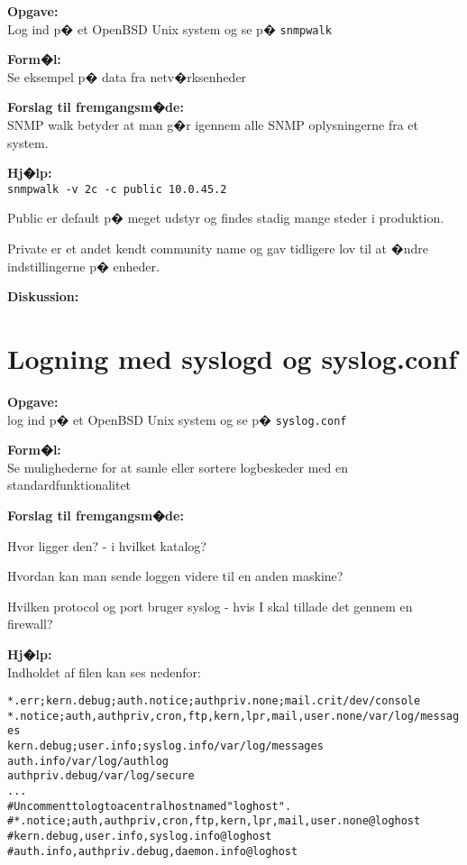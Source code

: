 \documentclass[a4paper,11pt,notitlepage]{oevelser}
\begin{document}
{\bfseries Opgave:}\\
Log ind p� et OpenBSD Unix system og se p� \verb+snmpwalk+

{\bfseries Form�l:}\\
Se eksempel p� data fra netv�rksenheder

{\bfseries Forslag til fremgangsm�de:}\\
SNMP walk betyder at man g�r igennem alle SNMP oplysningerne fra et system.

{\bfseries Hj�lp:}\\
\verb+snmpwalk -v 2c -c public 10.0.45.2+

Public er default p� meget udstyr og findes stadig mange steder i produktion.

Private er et andet kendt community name og gav tidligere lov til at �ndre indstillingerne p� enheder.

{\bfseries Diskussion:}\\








\chapter{Logning med syslogd og syslog.conf}
\label{ex:syslogd-basic}

{\bfseries Opgave:}\\
log ind p� et OpenBSD Unix system og se p� \verb+syslog.conf+

{\bfseries Form�l:}\\
Se mulighederne for at samle eller sortere logbeskeder med en standardfunktionalitet

{\bfseries Forslag til fremgangsm�de:}\\

\begin{list2}
\item Hvor ligger den? - i hvilket katalog?
\item Hvordan kan man sende loggen videre til en anden maskine?
\item Hvilken protocol og port bruger syslog - hvis I skal tillade det
  gennem en firewall?
\end{list2}

{\bfseries Hj�lp:}\\
 Indholdet af filen kan ses nedenfor:

\begin{alltt}
\small
*.err;kern.debug;auth.notice;authpriv.none;mail.crit    /dev/console
*.notice;auth,authpriv,cron,ftp,kern,lpr,mail,user.none /var/log/messages
kern.debug;user.info;syslog.info                        /var/log/messages
auth.info                                               /var/log/authlog
authpriv.debug                                          /var/log/secure
...
# Uncomment to log to a central host named "loghost".
#*.notice;auth,authpriv,cron,ftp,kern,lpr,mail,user.none        @loghost
#kern.debug,user.info,syslog.info                               @loghost
#auth.info,authpriv.debug,daemon.info                           @loghost
\end{alltt}
\end{document}
